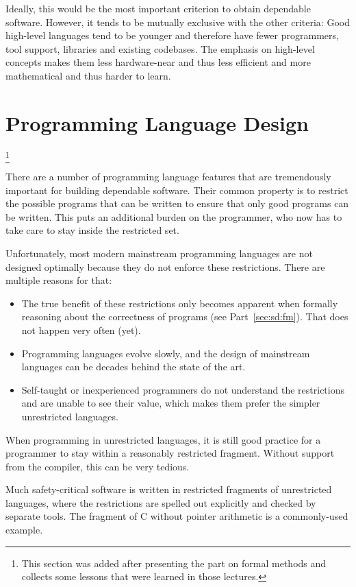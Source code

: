 Ideally, this would be the most important criterion to obtain dependable software.
However, it tends to be mutually exclusive with the other criteria:
Good high-level languages tend to be younger and therefore have fewer programmers, tool support, libraries and existing codebases.
The emphasis on high-level concepts makes them less hardware-near and thus less efficient and more mathematical and thus harder to learn.

\section{Programming Language Design}

\footnote{This section was added after presenting the part on formal methods and collects some lessons that were learned in those lectures.}

There are a number of programming language features that are tremendously important for building dependable software.
Their common property is to restrict the possible programs that can be written to ensure that only good programs can be written.
This puts an additional burden on the programmer, who now has to take care to stay inside the restricted set.

Unfortunately, most modern mainstream programming languages are not designed optimally because they do not enforce these restrictions.
There are multiple reasons for that:
\begin{itemize}
\item The true benefit of these restrictions only becomes apparent when formally reasoning about the correctness of programs (see Part~\ref{sec:sd:fm}).
  That does not happen very often (yet).
\item Programming languages evolve slowly, and the design of mainstream languages can be decades behind the state of the art.
\item Self-taught or inexperienced programmers do not understand the restrictions and are unable to see their value, which makes them prefer the simpler unrestricted languages.
\end{itemize}

When programming in unrestricted languages, it is still good practice for a programmer to stay within a reasonably restricted fragment.
Without support from the compiler, this can be very tedious.

Much safety-critical software is written in restricted fragments of unrestricted languages, where the restrictions are spelled out explicitly and checked by separate tools.
The fragment of C without pointer arithmetic is a commonly-used example.


